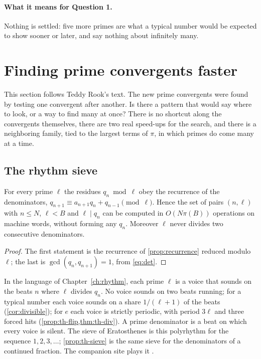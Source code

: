 \paragraph{What it means for Question 1.} Nothing is settled: five more primes are what a typical number would be expected to show sooner or later, and say nothing about infinitely many.

\section{Finding prime convergents faster}\label{sec:th6}
\addednote{\revC}

This section follows Teddy Rook's text. The new prime convergents were found by testing one convergent after another. Is there a pattern that would say where to look, or a way to find many at once? There is no shortcut along the convergents themselves, there are two real speed-ups for the search, and there is a neighboring family, tied to the largest terms of $\pi$, in which primes do come many at a time.

\subsection{The rhythm sieve}

\begin{proposition}\label{prop:th-sieve}
For every prime $\ell$ the residues $q_n \bmod \ell$ obey the recurrence of the denominators, $q_{n+1} \equiv a_{n+1}q_n + q_{n-1} \pmod \ell$. Hence the set of pairs $(n, \ell)$ with $n \le N$, $\ell < B$ and $\ell \mid q_n$ can be computed in $O(N\pi(B))$ operations on machine words, without forming any $q_n$. Moreover $\ell$ never divides two consecutive denominators.
\end{proposition}

\begin{proof}
The first statement is the recurrence of \cref{prop:recurrence} reduced modulo $\ell$; the last is $\gcd(q_n, q_{n+1}) = 1$, from \eqref{eq:det}.
\end{proof}

In the language of Chapter~\ref{ch:rhythm}, each prime $\ell$ is a voice that sounds on the beats $n$ where $\ell$ divides $q_n$. No voice sounds on two beats running; for a typical number each voice sounds on a share $1/(\ell + 1)$ of the beats (\cref{cor:divisible}); for $e$ each voice is strictly periodic, with period $3\ell$ and three forced hits (\cref{prop:th-flip,thm:th-div}). A prime denominator is a beat on which every voice is silent. The sieve of Eratosthenes is this polyrhythm for the sequence $1, 2, 3, \ldots$; \cref{prop:th-sieve} is the same sieve for the denominators of a continued fraction. The companion site plays it \citep{RhythmSite}.

